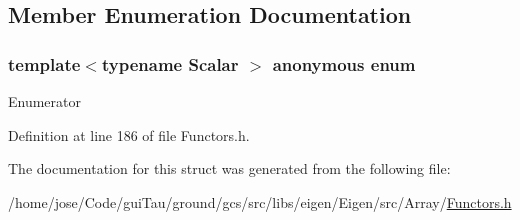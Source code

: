 \subsection{Member Enumeration Documentation}
\hypertarget{structei__functor__traits_3_01ei__scalar__square__op_3_01_scalar_01_4_01_4_ae3f1c226a01cffdde99de62dcde38373}{\subsubsection[{anonymous enum}]{\setlength{\rightskip}{0pt plus 5cm}template$<$typename Scalar $>$ anonymous enum}}\label{structei__functor__traits_3_01ei__scalar__square__op_3_01_scalar_01_4_01_4_ae3f1c226a01cffdde99de62dcde38373}
\begin{Desc}
\item[Enumerator]\par
\begin{description}
\item[{\em 
\hypertarget{structei__functor__traits_3_01ei__scalar__square__op_3_01_scalar_01_4_01_4_ae3f1c226a01cffdde99de62dcde38373af237e3d159c8508638a2a21e092eac9b}{Cost}\label{structei__functor__traits_3_01ei__scalar__square__op_3_01_scalar_01_4_01_4_ae3f1c226a01cffdde99de62dcde38373af237e3d159c8508638a2a21e092eac9b}
}]\end{description}
\end{Desc}


Definition at line 186 of file Functors.\-h.



The documentation for this struct was generated from the following file\-:\begin{DoxyCompactItemize}
\item 
/home/jose/\-Code/gui\-Tau/ground/gcs/src/libs/eigen/\-Eigen/src/\-Array/\hyperlink{_array_2_functors_8h}{Functors.\-h}\end{DoxyCompactItemize}
